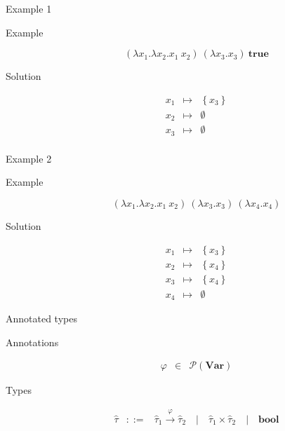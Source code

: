 \documentclass{beamer}
\newcommand{\Pipe}{\quad | \quad}
\newcommand{\Abs}[2]{\lambda #1.#2}
\newcommand{\App}[2]{#1\ #2}
\newcommand{\BTrue}{\mathbf{true}}
\newcommand{\TBool}{\mathbf{bool}}
\newcommand{\AFun}[3]{#1 \xrightarrow{#2} #3}
\newcommand{\TPair}[2]{#1 \times #2}
\begin{document}
\begin{frame}{Example 1}
	\begin{description}
		\item[Example]
			\[ \left(\Abs{x_1}{\Abs{x_2}{\App{x_1}{x_2}}}\right)\ \left(\Abs{x_3}{x_3}\right)\ \BTrue \]
		\item[Solution]
			\begin{eqnarray*}
				x_1 &\mapsto& \left\{x_3\right\} \\
				x_2 &\mapsto& \emptyset \\
				x_3 &\mapsto& \emptyset \\
			\end{eqnarray*}
	\end{description}
\end{frame}

\begin{frame}{Example 2}
	\begin{description}
		\item[Example]
			\[ \left(\Abs{x_1}{\Abs{x_2}{\App{x_1}{x_2}}}\right)\ \left(\Abs{x_3}{x_3}\right)\ \left(\Abs{x_4}{x_4}\right) \]
		\item[Solution]
			\begin{eqnarray*}
				x_1 &\mapsto& \left\{x_3\right\} \\
				x_2 &\mapsto& \left\{x_4\right\} \\
				x_3 &\mapsto& \left\{x_4\right\} \\
				x_4 &\mapsto& \emptyset
			\end{eqnarray*}
	\end{description}
\end{frame}

\begin{frame}{Annotated types}
	\begin{description}
		\item[Annotations]
			\begin{eqnarray*}
				\varphi &\in& \mathcal{P}(\mathbf{Var})
			\end{eqnarray*}
		\item[Types]
			\begin{eqnarray*}
				\widehat\tau &::=& \AFun{\widehat\tau_1}{\varphi}{\widehat\tau_2} \Pipe \TPair{\widehat\tau_1}{\widehat\tau_2} \Pipe \TBool
			\end{eqnarray*}
	\end{description}
\end{frame}
\end{document}
